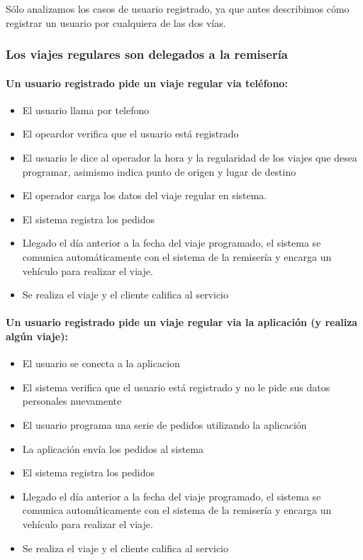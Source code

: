 \documentclass[a4paper]{article}
\begin{document}
S\'olo analizamos los casos de usuario registrado, ya que antes describimos c\'omo registrar un usuario por cualquiera de las dos v\'ias.

\subsubsection{Los viajes regulares son delegados a la remiser\'ia}

\paragraph{Un usuario registrado pide un viaje regular via tel\'efono:}
\begin{itemize}
\item El usuario llama por telefono
\item El opeardor verifica que el usuario est\'a registrado
\item El usuario le dice al operador la hora y la regularidad de los viajes que desea programar, asimismo indica punto de origen y lugar de destino
\item El operador carga los datos del viaje regular en sistema.
\item El sistema registra los pedidos 
\item Llegado el d\'ia anterior a la fecha del viaje programado, el sistema se comunica autom\'aticamente con el sistema de la remiser\'ia y encarga un veh\'iculo para realizar el viaje.
\item Se realiza el viaje y el cliente califica al servicio
\end{itemize}


\paragraph{Un usuario registrado pide un viaje regular via la aplicaci\'on (y realiza alg\'un viaje):}
\begin{itemize}
\item El usuario se conecta a la aplicacion
\item El sistema verifica que el usuario est\'a registrado y no le pide sus datos personales nuevamente
\item El usuario programa una serie de pedidos utilizando la aplicaci\'on
\item La aplicaci\'on env\'ia los pedidos al sistema
\item El sistema registra los pedidos 
\item Llegado el d\'ia anterior a la fecha del viaje programado, el sistema se comunica autom\'aticamente con el sistema de la remiser\'ia y encarga un veh\'iculo para realizar el viaje.
\item Se realiza el viaje y el cliente califica al servicio
\end{itemize}
\end{document}

